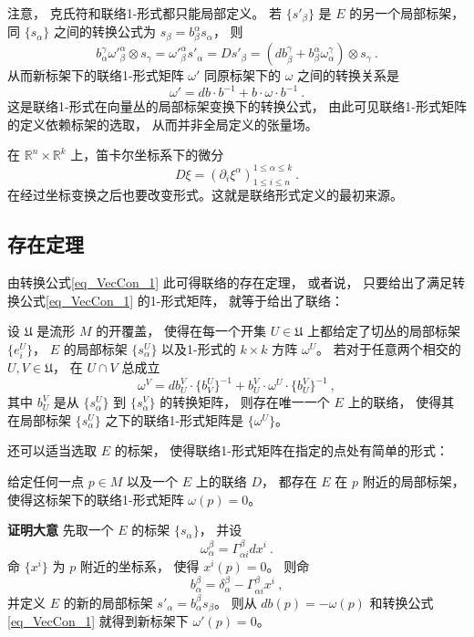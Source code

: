注意， 克氏符和联络1-形式都只能局部定义。 若 $\{s'_\beta\}$ 是 $E$ 的另一个局部标架， 同 $\{s_\alpha\}$ 之间的转换公式为 $s_\beta=b_\beta^\alpha s_\alpha$， 则
$$
b_\alpha^\gamma{\omega'}_{\beta}^{\alpha}\otimes s_\gamma={\omega'}_{\beta}^{\alpha}s'_\alpha=Ds'_\beta=(db_\beta^\gamma+b_\beta^\alpha\omega_\alpha^\gamma)\otimes s_\gamma~.
$$
从而新标架下的联络1-形式矩阵 $\omega'$ 同原标架下的 $\omega$ 之间的转换关系是
\begin{equation}\label{eq_VecCon_1}
\omega'=db\cdot b^{-1}+b\cdot\omega\cdot b^{-1}~.
\end{equation}
这是联络1-形式在向量丛的局部标架变换下的转换公式， 由此可见联络1-形式矩阵的定义依赖标架的选取， 从而并非全局定义的张量场。

在 $\mathbb{R}^n\times\mathbb{R}^k$ 上，笛卡尔坐标系下的微分
$$
D\xi=(\partial_i\xi^\alpha)_{1\leq i\leq n}^{1\leq\alpha\leq k}~.
$$
在经过坐标变换之后也要改变形式。这就是联络形式定义的最初来源。

\subsection{存在定理}
由转换公式\autoref{eq_VecCon_1} 此可得联络的存在定理， 或者说， 只要给出了满足转换公式\autoref{eq_VecCon_1} 的1-形式矩阵， 就等于给出了联络：
\begin{theorem}{}
设 $\mathfrak{U}$ 是流形 $M$ 的开覆盖， 使得在每一个开集 $U\in\mathfrak{U}$ 上都给定了切丛的局部标架 $\{e^U_i\}$， $E$ 的局部标架 $\{s^U_\alpha\}$ 以及1-形式的 $k\times k$ 方阵 $\omega^U$。 若对于任意两个相交的 $U,V\in\mathfrak{U}$， 在 $U\cap V$ 总成立
$$
\omega^V=db^V_U\cdot \{b_V^U\}^{-1}+b^V_U\cdot\omega^U\cdot \{b^V_U\}^{-1}~,
$$
其中 $b^V_U$ 是从 $\{s^U_\alpha\}$ 到 $\{s^V_\alpha\}$ 的转换矩阵， 则存在唯一一个 $E$ 上的联络， 使得其在局部标架 $\{s^U_\alpha\}$ 之下的联络1-形式矩阵是 $\{\omega^U\}$。
\end{theorem}

还可以适当选取 $E$ 的标架， 使得联络1-形式矩阵在指定的点处有简单的形式：
\begin{theorem}{}
给定任何一点 $p\in M$ 以及一个 $E$ 上的联络 $D$， 都存在 $E$ 在 $p$ 附近的局部标架， 使得这标架下的联络1-形式矩阵 $\omega(p)=0$。
\end{theorem}
\textbf{证明大意} 先取一个 $E$ 的标架 $\{s_\alpha\}$， 并设
$$
\omega^\beta_\alpha=\Gamma_{\alpha i}^\beta dx^i~.
$$
命 $\{x^i\}$ 为 $p$ 附近的坐标系， 使得 $x^i(p)=0$。 则命
$$
b_\alpha^\beta=\delta_\alpha^\beta-\Gamma_{\alpha i}^\beta x^i~,
$$
并定义 $E$ 的新的局部标架 $s'_\alpha=b_\alpha^\beta s_\beta$。 则从 $db(p)=-\omega(p)$ 和转换公式\autoref{eq_VecCon_1} 就得到新标架下 $\omega'(p)=0$。

